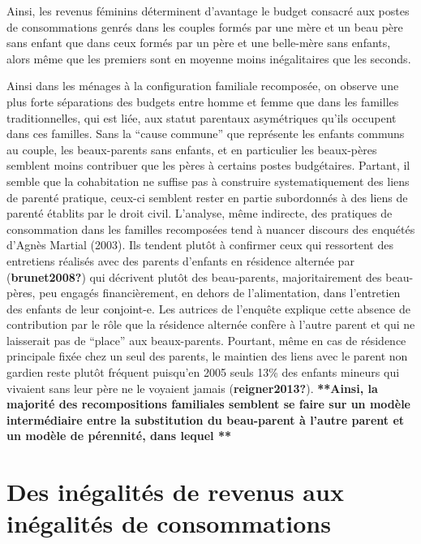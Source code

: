 \documentclass[
  12pt,
]{book}
\begin{document}
Ainsi, les revenus féminins déterminent d'avantage le budget consacré
aux postes de consommations genrés dans les couples formés par une mère
et un beau père sans enfant que dans ceux formés par un père et une
belle-mère sans enfants, alors même que les premiers sont en moyenne
moins inégalitaires que les seconds.

Ainsi dans les ménages à la configuration familiale recomposée, on
observe une plus forte séparations des budgets entre homme et femme que
dans les familles traditionnelles, qui est liée, aux statut parentaux
asymétriques qu'ils occupent dans ces familles. Sans la ``cause
commune'' que représente les enfants communs au couple, les
beaux-parents sans enfants, et en particulier les beaux-pères semblent
moins contribuer que les pères à certains postes budgétaires. Partant,
il semble que la cohabitation ne suffise pas à construire
systematiquement des liens de parenté pratique, ceux-ci semblent rester
en partie subordonnés à des liens de parenté établits par le droit
civil. L'analyse, même indirecte, des pratiques de consommation dans les
familles recomposées tend à nuancer discours des enquétés d'Agnès
Martial (2003). Ils tendent plutôt à confirmer ceux qui ressortent des
entretiens réalisés avec des parents d'enfants en résidence alternée par
(\textbf{brunet2008?}) qui décrivent plutôt des beau-parents,
majoritairement des beau-pères, peu engagés financièrement, en dehors de
l'alimentation, dans l'entretien des enfants de leur conjoint-e. Les
autrices de l'enquête explique cette absence de contribution par le rôle
que la résidence alternée confère à l'autre parent et qui ne laisserait
pas de ``place'' aux beaux-parents. Pourtant, même en cas de résidence
principale fixée chez un seul des parents, le maintien des liens avec le
parent non gardien reste plutôt fréquent puisqu'en 2005 seuls 13\% des
enfants mineurs qui vivaient sans leur père ne le voyaient jamais
(\textbf{reigner2013?}). \textbf{**Ainsi, la majorité des recompositions
familiales semblent se faire sur un modèle intermédiaire entre la
substitution du beau-parent à l'autre parent et un modèle de pérennité,
dans lequel **}

\section{Des inégalités de revenus aux inégalités de
consommations}\label{des-inuxe9galituxe9s-de-revenus-aux-inuxe9galituxe9s-de-consommations}
\end{document}
